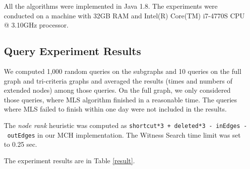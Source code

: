 
All the algorithms were implemented in Java 1.8. The experiments were conducted on a machine with 
32GB RAM and Intel(R) Core(TM) i7-4770S CPU @ 3.10GHz processor.


\subsection{Query Experiment Results}

We computed 1,000 random queries on the subgraphs and 10 queries on the full graph and tri-criteria graphs and averaged the results (times and numbers of extended nodes) among those queries. 
On the full graph, we only considered those queries, where MLS algorithm finished in a reasonable time. The queries where MLS failed to finish within one day were not included in the results. 

The {\em node rank} heuristic was computed as {\tt shortcut*3 + deleted*3 -~inEdges -~outEdges} in our MCH implementation. The Witness Search time limit was set to 0.25 sec. 

\noindent The experiment results are in Table \ref{result}. 

